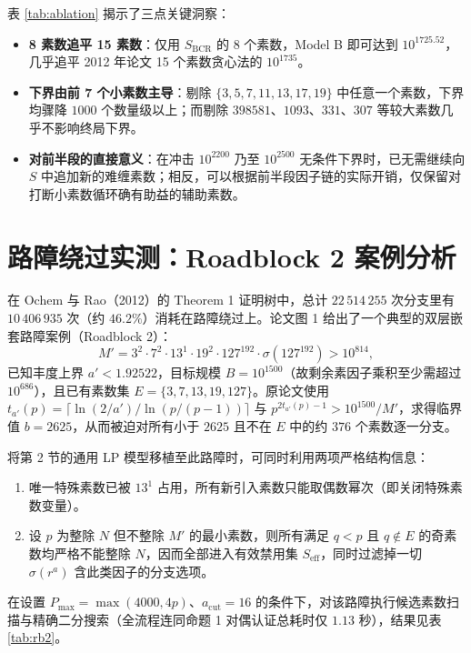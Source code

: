 \documentclass[11pt, a4paper]{article}
\begin{document}
表 \ref{tab:ablation} 揭示了三点关键洞察：
\begin{itemize}
    \item \textbf{8 素数追平 15 素数}：仅用 $S_{\mathrm{BCR}}$ 的 8 个素数，Model B 即可达到 $10^{1725.52}$，几乎追平 2012 年论文 15 个素数贪心法的 $10^{1735}$。
    \item \textbf{下界由前 7 个小素数主导}：剔除 $\{3, 5, 7, 11, 13, 17, 19\}$ 中任意一个素数，下界均骤降 $1000$ 个数量级以上；而剔除 $398581$、$1093$、$331$、$307$ 等较大素数几乎不影响终局下界。
    \item \textbf{对前半段的直接意义}：在冲击 $10^{2200}$ 乃至 $10^{2500}$ 无条件下界时，已无需继续向 $S$ 中追加新的难缠素数；相反，可以根据前半段因子链的实际开销，仅保留对打断小素数循环确有助益的辅助素数。
\end{itemize}

\section{路障绕过实测：Roadblock 2 案例分析}

在 Ochem 与 Rao（2012）的 Theorem 1 证明树中，总计 $22\,514\,255$ 次分支里有 $10\,406\,935$ 次（约 $46.2\%$）消耗在路障绕过上。论文图 1 给出了一个典型的双层嵌套路障案例（Roadblock 2）：
\[
M' = 3^2 \cdot 7^2 \cdot 13^1 \cdot 19^2 \cdot 127^{192} \cdot \sigma(127^{192}) > 10^{814},
\]
已知丰度上界 $a' < 1.92522$，目标规模 $B = 10^{1500}$（故剩余素因子乘积至少需超过 $10^{686}$），且已有素数集 $E = \{3, 7, 13, 19, 127\}$。原论文使用 $t_{a'}(p) = \lceil \ln(2/a') / \ln(p/(p-1)) \rceil$ 与 $p^{2t_{a'}(p)-1} > 10^{1500}/M'$，求得临界值 $b = 2625$，从而被迫对所有小于 $2625$ 且不在 $E$ 中的约 $376$ 个素数逐一分支。

将第 2 节的通用 LP 模型移植至此路障时，可同时利用两项严格结构信息：
\begin{enumerate}
    \item 唯一特殊素数已被 $13^1$ 占用，所有新引入素数只能取偶数幂次（即关闭特殊素数变量）。
    \item 设 $p$ 为整除 $N$ 但不整除 $M'$ 的最小素数，则所有满足 $q < p$ 且 $q \notin E$ 的奇素数均严格不能整除 $N$，因而全部进入有效禁用集 $S_{\mathrm{eff}}$，同时过滤掉一切 $\sigma(r^a)$ 含此类因子的分支选项。
\end{enumerate}

在设置 $P_{\max} = \max(4000, 4p)$、$a_{\mathrm{cut}} = 16$ 的条件下，对该路障执行候选素数扫描与精确二分搜索（全流程连同命题 1 对偶认证总耗时仅 $1.13$ 秒），结果见表 \ref{tab:rb2}。
\end{document}
